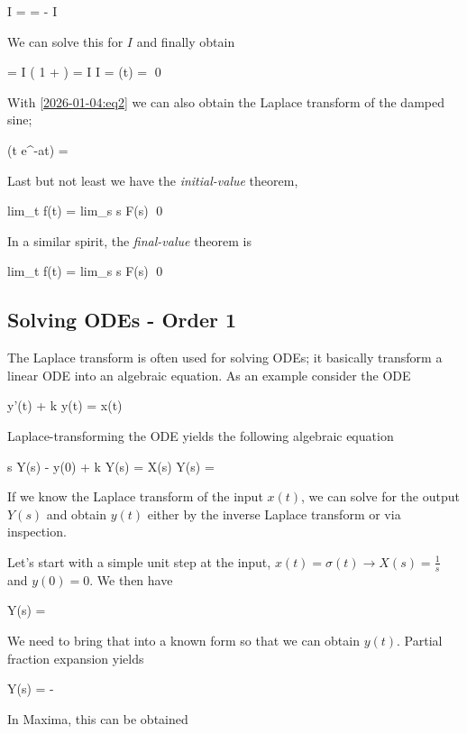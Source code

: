 \bee
I =   =  - I
\eee

We can solve this for $I$ and finally obtain

\bee
{} = I \left( 1 +  \right) = I  \rightarrow I = \Lc(\sin \omega t) =  \qed
\eee

With \eqref{2026-01-04:eq2} we can also obtain the Laplace transform of the damped sine; 

\bee
\Lc(\sin \omega t e^{-at}) = 
\eee

Last but not least we have the \emph{initial-value} theorem,

\bee
lim_{t } f(t) = lim_{s \rightarrow \infty} s F(s) \qed
\eee

In a similar spirit, the \emph{final-value} theorem is

\bee
lim_{t \rightarrow \infty} f(t) = lim_{s } s F(s) \qed
\eee


\subsection{Solving ODEs - Order 1}

The Laplace transform is often used for solving ODEs; it basically transform a linear ODE into an algebraic equation. As an example consider the ODE

\bee
y'(t) + k y(t) = x(t)
\eee

Laplace-transforming the ODE yields the following algebraic equation

\bee
s Y(s) - y(0) + k Y(s) = X(s) \rightarrow Y(s) = 
\eee

If we know the Laplace transform of the input $x(t)$, we can solve for the output $Y(s)$ and obtain $y(t)$ either by the inverse Laplace transform or via inspection.

Let's start with a simple unit step at the input, $x(t) = \sigma(t) \rightarrow X(s) = \frac{1}{s}$ and $y(0) = 0$. We then have

\bee
Y(s) = 
\eee

We need to bring that into a known form so that we can obtain $y(t)$. Partial fraction expansion yields

\bee
Y(s) =   -  
\eee

In Maxima, this can be obtained


